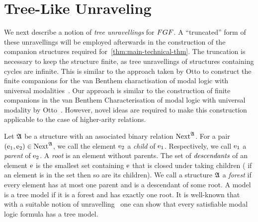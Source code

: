 
\section{Tree-Like Unraveling}\label{sec:unraveling}
We next describe a notion of \emph{tree unravellings} for $\FGF$.
A ``truncated'' form of these unravellings will be employed afterwards in the construction of the companion structures required for~\cref{thm:main-technical-thm}.
The truncation is necessary to keep the structure finite, as tree unravellings of structures containing cycles are infinite.
This is similar to the approach taken by Otto to construct the finite companions for the van Benthem charactisation of modal logic with universal modalities~\cite[Proof of Lemma 38]{Otto04}.
Our approach is similar to the construction of finite companions in the van Benthem Characterisation of modal logic with universal modality by Otto~\cite[Proof of Lemma 38]{Otto04}.
However, novel ideas are required to make this construction applicable to the case of higher-arity relations.

Let ${\mathfrak{A}}$ be a structure with an associated binary relation $\mathrm{Next}^{{\mathfrak{A}}}$.
For a pair $(\mathrm{e}_1, \mathrm{e}_2) \in \mathrm{Next}^{{\mathfrak{A}}}$, we call the element $\mathrm{e}_2$ a \emph{child} of $\mathrm{e}_1$. Respectively, we call $\mathrm{e}_1$ a \emph{parent} of $\mathrm{e}_2$.
A \emph{root} is an element without parents.
The set of $\emph{descendants}$ of an element $\mathrm{e}$ is the smallest set containing $\mathrm{e}$ that is closed under taking children (\ie{} if an element is in the set then so are its children).
We call a structure ${\mathfrak{A}}$ a \emph{forest} if every element has at most one parent and is a descendant of some root.
A model is a tree model if it is a forest and has exactly one root.
It is well-known that with a suitable notion of unravelling~\cite[Prop. 3]{Rosen97} one can show that every satisfiable modal logic formula has a tree model.

